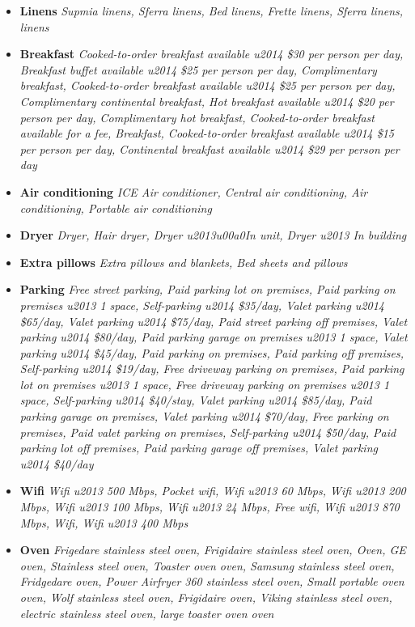 \begin{itemize}
	\item \textbf{Linens} \textrightarrow \textit{Supmia linens, Sferra  linens, Bed linens, Frette linens, Sferra linens,  linens}
	\item \textbf{Breakfast} \textrightarrow \textit{Cooked-to-order breakfast available u2014 \$30 per person per day, Breakfast buffet available u2014 \$25 per person per day, Complimentary breakfast, Cooked-to-order breakfast available u2014 \$25 per person per day, Complimentary continental breakfast, Hot breakfast available u2014 \$20 per person per day, Complimentary hot breakfast, Cooked-to-order breakfast available for a fee, Breakfast, Cooked-to-order breakfast available u2014 \$15 per person per day, Continental breakfast available u2014 \$29 per person per day}
	\item \textbf{Air conditioning} \textrightarrow \textit{ICE Air conditioner, Central air conditioning, Air conditioning, Portable air conditioning}
	\item \textbf{Dryer} \textrightarrow \textit{Dryer, Hair dryer, Dryer u2013u00a0In unit, Dryer u2013 In building}
	\item \textbf{Extra pillows} \textrightarrow \textit{Extra pillows and blankets, Bed sheets and pillows}
	\item \textbf{Parking} \textrightarrow \textit{Free street parking, Paid parking lot on premises, Paid parking on premises u2013 1 space, Self-parking u2014 \$35/day, Valet parking u2014 \$65/day, Valet parking u2014 \$75/day, Paid street parking off premises, Valet parking u2014 \$80/day, Paid parking garage on premises u2013 1 space, Valet parking u2014 \$45/day, Paid parking on premises, Paid parking off premises, Self-parking u2014 \$19/day, Free driveway parking on premises, Paid parking lot on premises u2013 1 space, Free driveway parking on premises u2013 1 space, Self-parking u2014 \$40/stay, Valet parking u2014 \$85/day, Paid parking garage on premises, Valet parking u2014 \$70/day, Free parking on premises, Paid valet parking on premises, Self-parking u2014 \$50/day, Paid parking lot off premises, Paid parking garage off premises, Valet parking u2014 \$40/day}
	\item \textbf{Wifi} \textrightarrow \textit{Wifi u2013 500 Mbps, Pocket wifi, Wifi u2013 60 Mbps, Wifi u2013 200 Mbps, Wifi u2013 100 Mbps, Wifi u2013 24 Mbps, Free wifi, Wifi u2013 870 Mbps, Wifi, Wifi u2013 400 Mbps}
	\item \textbf{Oven} \textrightarrow \textit{Frigedare stainless steel oven, Frigidaire stainless steel oven, Oven, GE oven, Stainless steel oven, Toaster oven oven, Samsung stainless steel oven, Fridgedare oven, Power Airfryer 360 stainless steel oven, Small portable oven oven, Wolf stainless steel oven, Frigidaire oven, Viking stainless steel oven, electric  stainless steel oven, large toaster oven oven}

\end{itemize}
